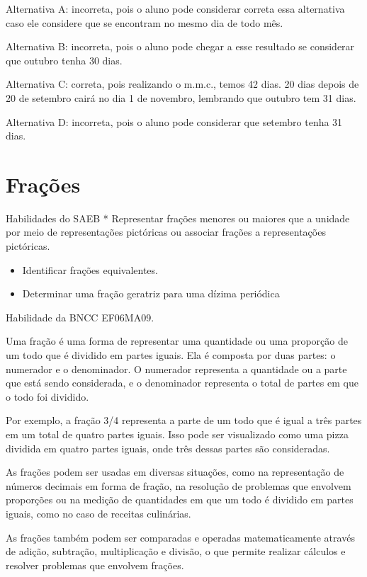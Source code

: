 Alternativa A: incorreta, pois o aluno pode considerar correta essa
alternativa caso ele considere que se encontram no mesmo dia de todo
mês.

Alternativa B: incorreta, pois o aluno pode chegar a esse resultado se
considerar que outubro tenha 30 dias.

Alternativa C: correta, pois realizando o m.m.c., temos 42 dias. 20 dias
depois de 20 de setembro cairá no dia 1 de novembro, lembrando que
outubro tem 31 dias.

Alternativa D: incorreta, pois o aluno pode considerar que setembro
tenha 31 dias.

\chapter{Frações}

Habilidades do SAEB * Representar frações menores ou maiores que a
unidade por meio de representações pictóricas ou associar frações a
representações pictóricas.

\begin{itemize}
\item
  Identificar frações equivalentes.
\item
  Determinar uma fração geratriz para uma dízima periódica
\end{itemize}

Habilidade da BNCC EF06MA09.

Uma fração é uma forma de representar uma quantidade ou uma proporção de
um todo que é dividido em partes iguais. Ela é composta por duas partes:
o numerador e o denominador. O numerador representa a quantidade ou a
parte que está sendo considerada, e o denominador representa o total de
partes em que o todo foi dividido.

Por exemplo, a fração 3/4 representa a parte de um todo que é igual a
três partes em um total de quatro partes iguais. Isso pode ser
visualizado como uma pizza dividida em quatro partes iguais, onde três
dessas partes são consideradas.

As frações podem ser usadas em diversas situações, como na representação
de números decimais em forma de fração, na resolução de problemas que
envolvem proporções ou na medição de quantidades em que um todo é
dividido em partes iguais, como no caso de receitas culinárias.

As frações também podem ser comparadas e operadas matematicamente
através de adição, subtração, multiplicação e divisão, o que permite
realizar cálculos e resolver problemas que envolvem frações.

